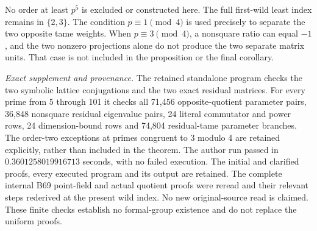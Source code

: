 \begin{remark}
\label{rem:B-RD83-scope}
No order at least \(p^5\) is excluded or constructed here.
The full first-wild least index remains in \(\{2,3\}\).
The condition \(p\equiv1\pmod4\) is used precisely to
separate the two opposite tame weights. When
\(p\equiv3\pmod4\), a nonsquare ratio can equal \(-1\),
and the two nonzero projections alone do not produce the
two separate matrix units. That case is not included in
the proposition or the final corollary.

\smallskip
\noindent\emph{Exact supplement and provenance.}
The retained standalone program
checks the two symbolic lattice conjugations and the two
exact residual matrices. For every prime from 5 through 101
it checks all 71,456 opposite-quotient parameter pairs,
36,848 nonsquare residual eigenvalue pairs, 24 literal
commutator and power rows, 24 dimension-bound rows and
74,804 residual-tame parameter branches. The order-two
exceptions at primes congruent to 3 modulo 4 are retained
explicitly, rather than included in the theorem.
The author run passed in \(0.3601258019916713\) seconds,
with no failed execution. The initial and clarified proofs,
every executed program and its output are retained. The
complete internal B69 point-field and actual quotient
proofs were reread and their relevant steps rederived
at the present wild index. No new original-source read
is claimed. These finite checks establish no formal-group
existence and do not replace the uniform proofs.
\end{remark}
